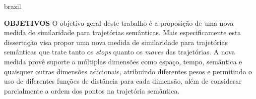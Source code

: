 {\begin{otherlanguage*}{brazil}
\begin{resumo}
        \newline
        \newline
        \textbf{OBJETIVOS}
        \newline
        \newline
        O objetivo geral deste trabalho é a proposição de uma nova medida de similaridade para trajetórias semânticas.
        Mais especificamente esta dissertação visa propor uma nova medida de similaridade para trajetórias semânticas que trate tanto os \emph{stops} quanto os \emph{moves} das trajetórias. A nova medida provê suporte a múltiplas dimensões como espaço, tempo, semântica e quaisquer outras dimensões adicionais, atribuindo diferentes pesos e permitindo o uso de diferentes funções de distância para cada dimensão, além de considerar parcialmente a ordem dos pontos na trajetória semântica. 
        \newline
        \newline
        

\end{resumo}
\end{otherlanguage*}}
